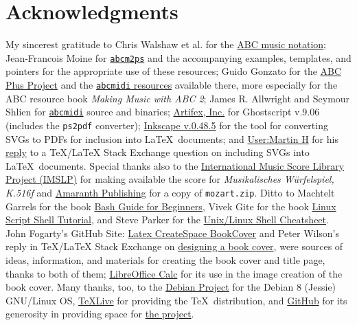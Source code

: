 \documentclass[letterpaper,x11names,svgnames,10pt]{article}
\begin{document}
{\section{Acknowledgments}
My sincerest gratitude to Chris Walshaw et al. for the \hyperref{http://www.abcnotation.com/}{}{}{ABC music notation}; Jean-Francois Moine for \hyperref{http://moinejf.free.fr/}{}{}{\tt abcm2ps} and the accompanying examples, templates, and pointers for the appropriate use of these resources; Guido Gonzato for the \hyperref{http://abcplus.sourceforge.net/}{}{}{ABC Plus Project} and the \hyperref{http://abcplus.sourceforge.net/#abcMIDI}{}{}{{\tt abcmidi} resources} available there, more especially for the ABC resource book {\em Making Music with ABC 2}; James R. Allwright and Seymour Shlien for \hyperref{http://abc.sourceforge.net/abcMIDI}{}{}{\tt abcmidi} source and binaries; \hyperref{https://artifex.com/}{}{}{Artifex, Inc.} for Ghostscript v.9.06 (includes the {\tt ps2pdf} converter); \hyperref{https://www.inkscape.org/}{}{}{Inkscape v.0.48.5} for the tool for converting SVGs to PDFs for inclusion into \LaTeX\ documents; and \hyperref{https://tex.stackexchange.com/users/632/martin-h}{}{}{User:Martin H} for his \hyperref{https://tex.stackexchange.com/questions/2099/how-to-include-svg-diagrams-in-latex}{}{}{reply} to a TeX/LaTeX Stack Exchange question on including SVGs into \LaTeX\ documents. Special thanks also to the \hyperref{http://imslp.org/}{}{}{International Music Score Library Project (IMSLP)} for making available the score for {\em Musikalisches W\"{u}rfelspiel, K.516f} and \hyperref{http://www.amaranthpublishing.com/MozartDiceGame.htm}{}{}{Amaranth Publishing} for a copy of {\tt mozart.zip}. Ditto to Machtelt Garrels for the book \hyperref{http://tldp.org/LDP/Bash-Beginners-Guide/html/Bash-Beginners-Guide.html}{}{}{Bash Guide for Beginners}, Vivek Gite for the book \hyperref{http://www.freeos.com/guides/lsst/}{}{}{Linux Script Shell Tutorial}, and Steve Parker for the \hyperref{http://steve-parker.org/sh/cheatsheet.pdf}{}{}{Unix/Linux Shell Cheatsheet}. John Fogarty's GitHub Site: \hyperref{https://github.com/jfogarty/latex-createspace-bookcover}{}{}{Latex CreateSpace BookCover} and Peter Wilson's reply in TeX/LaTeX Stack Exchange on \hyperref{https://tex.stackexchange.com/questions/17579/how-can-i-design-a-book-cover}{}{}{designing a book cover}, were sources of ideas, information, and materials for creating the book cover and title page, thanks to both of them; \hyperref{http://www.libreoffice.org/}{}{}{LibreOffice Calc} for its use in the image creation of the book cover.  Many thanks, too, to the \hyperref{https://www.debian.org}{}{}{Debian Project} for the Debian 8 (Jessie) GNU/Linux OS, \hyperref{http://www.tug.org/texlive/}{}{}{TeXLive} for providing the \TeX\ distribution,  and \hyperref{https://github.org}{}{}{GitHub} for its generosity in providing space for \hyperref{https://github.com/justineuro/mdgBookSVGv1}{}{}{the project}.  

}
\end{document}
